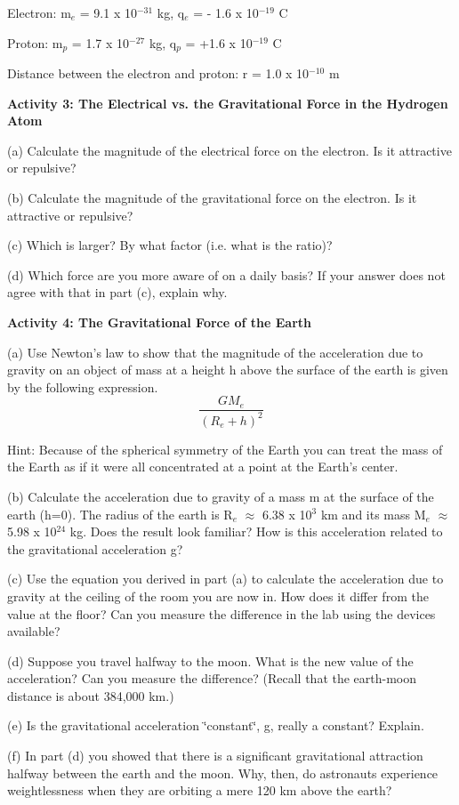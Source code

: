 Electron: m\( _{e} \) = 9.1 x 10\( ^{-31} \) kg, q\( _{e} \) = - 1.6 x 10\( ^{-19} \)
C 

Proton: m\( _{p} \) = 1.7 x 10\( ^{-27} \) kg, q\( _{p} \) = +1.6 x 10\( ^{-19} \)
C 

Distance between the electron and proton: r = 1.0 x 10\( ^{-10} \) m

\textbf{Activity 3: The Electrical vs. the Gravitational Force in the Hydrogen
Atom}

(a) Calculate the magnitude of the electrical force on the electron. Is it attractive
or repulsive?
\vspace{20mm}

(b) Calculate the magnitude of the gravitational force on the electron. Is it
attractive or repulsive?
\vspace{20mm}

(c) Which is larger? By what factor (i.e. what is the ratio)?
\vspace{20mm}

(d) Which force are you more aware of on a daily basis? If your answer does
not agree with that in part (c), explain why.
\vspace{20mm}

\textbf{Activity 4: The Gravitational Force of the Earth}

(a) Use Newton's law to show that the magnitude of the acceleration due to gravity
on an object of mass at a height h above the surface of the earth is given by
the following expression.
\[
\frac{GM_{e}}{\left( R_{e}+h\right) ^{2}}\]


Hint: Because of the spherical symmetry of the Earth you can treat the mass
of the Earth as if it were all concentrated at a point at the Earth's center.
\vspace{20mm}

(b) Calculate the acceleration due to gravity of a mass m at the surface of
the earth (h=0). The radius of the earth is R\( _{e} \) \( \approx  \) 6.38
x 10\( ^{3} \) km and its mass M\( _{e} \) \( \approx  \) 5.98 x 10\( ^{24} \)
kg. Does the result look familiar? How is this acceleration related to the gravitational
acceleration g?
\vspace{30mm}

(c) Use the equation you derived in part (a) to calculate the acceleration due
to gravity at the ceiling of the room you are now in. How does it differ from
the value at the floor? Can you measure the difference in the lab using the
devices available?
\vspace{20mm}

(d) Suppose you travel halfway to the moon. What is the new value of the acceleration?
Can you measure the difference? (Recall that the earth-moon distance is about
384,000 km.)
\vspace{20mm}

(e) Is the gravitational acceleration \char`\"{}constant\char`\"{}, g, really
a constant? Explain.
\vspace{20mm}

(f) In part (d) you showed that there is a significant gravitational attraction
halfway between the earth and the moon. Why, then, do astronauts experience
weightlessness when they are orbiting a mere 120 km above the earth?

